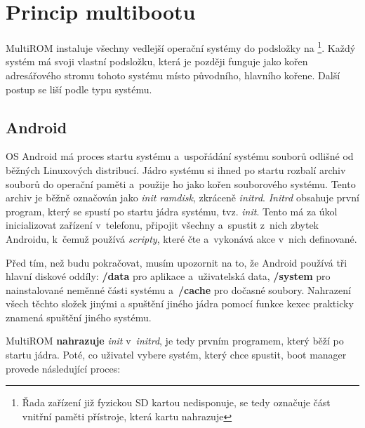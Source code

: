 \documentclass[12pt, a4paper, oneside]{article}
\newcommand{\B}{\textbf} %
\newcommand{\It}{\textit}  %
\begin{document}
\newpage
\section {Princip multibootu}
\label{princip-multibootu}
MultiROM instaluje všechny vedlejší operační systémy do podsložky na \footnote{Řada zařízení již fyzickou SD kartou nedisponuje,  se tedy označuje část vnitřní paměti přístroje, která kartu nahrazuje}. Každý systém má svoji vlastní podsložku, která je později funguje jako kořen adresářového stromu tohoto systému místo původního, hlavního kořene. Další postup se liší podle typu systému.

\subsection{Android}
OS Android má proces startu systému a~uspořádání systému souborů odlišné od běžných Linuxových distribucí. Jádro systému si ihned po startu rozbalí archiv souborů do operační paměti a~použije ho jako kořen souborového systému. Tento archiv je běžně označován jako \It{init ramdisk}, zkráceně \It{initrd}. \It{Initrd} obsahuje první program, který se spustí po startu jádra systému, tvz. \It{init}. Tento má za úkol inicializovat zařízení v~telefonu, připojit všechny  a~spustit z~nich zbytek Androidu, k~čemuž používá \It{scripty}, které čte a~vykonává akce v~nich definované.

Před tím, než budu pokračovat, musím upozornit na to, že Android používá tři hlavní diskové oddíly: \B{/data} pro aplikace a~uživatelská data, \B{/system} pro nainstalované neměnné části systému a~\B{/cache} pro dočasné soubory. Nahrazení všech těchto složek jinými a spuštění jiného jádra pomocí funkce kexec prakticky znamená spuštění jiného systému.

MultiROM \B{nahrazuje} \It{init} v~\It{initrd}, je tedy prvním programem, který běží po startu jádra. Poté, co uživatel vybere systém, který chce spustit, boot manager provede následující proces:
\end{document}
